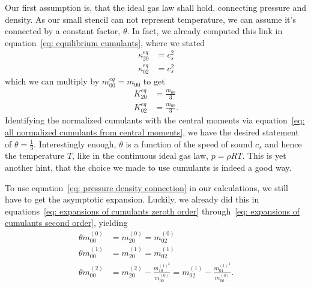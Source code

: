 Our first assumption is, that the ideal gas law shall hold, connecting pressure and density.
As our small stencil can not represent temperature, we can assume it's connected by a constant factor, $\theta$.
In fact, we already computed this link in equation~\eqref{eq: equilibrium cumulants}, where we stated
\begin{equation}
  \begin{aligned}
    \kappa_{20}^{eq} & = c_s^2  \\
    \kappa_{02}^{eq} & = c_s^2
  \end{aligned}
\end{equation}
which we can multiply by $m_{00}^{eq} = m_{00}$ to get
\begin{equation}
\label{eq: pressure density connection}
  \begin{aligned}
    K_{20}^{eq} & = \frac{m_{00}}{3}  \\
    K_{02}^{eq} & = \frac{m_{00}}{3}.
  \end{aligned}
\end{equation}
Identifying the normalized cumulants with the central moments via equation~\eqref{eq: all normalized cumulants from central moments}, we have the desired statement of $\theta=\frac{1}{3}$.
Interestingly enough, $\theta$ is a function of the speed of sound $c_s$ and hence the temperature $T$, like in the continuous ideal gas law, $p=\rho RT$.
This is yet another hint, that the choice we made to use cumulants is indeed a good way.

To use equation~\eqref{eq: pressure density connection} in our calculations, we still have to get the asymptotic expansion.
Luckily, we already did this in equations~\eqref{eq: expansions of cumulants zeroth order} through~\eqref{eq: expansions of cumulants second order}, yielding
\begin{align}
  \label{eq: ideal gas zeroth order}
  \theta m_{00}^{(0)} &= m_{20}^{(0)} = m_{02}^{(0)}
  \\
  \label{eq: ideal gas first order}
  \theta m_{00}^{(1)} &= m_{20}^{(1)} = m_{02}^{(1)}
  \\
  \label{eq: ideal gas second order}
  \theta m_{00}^{(2)} &= m_{20}^{(2)} - \frac{m_{10}^{{(1)}^2}}{m_{00}^{(0)}}  = m_{02}^{(1)} - \frac{m_{01}^{{(1)}^2}}{m_{00}^{(0)}}.
\end{align}
